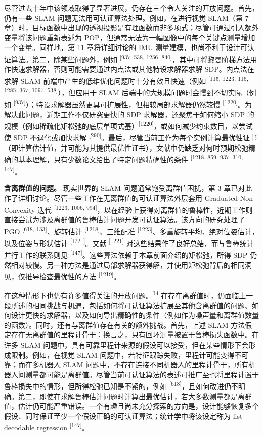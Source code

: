 尽管过去十年中该领域取得了显著进展，仍存在三个令人关注的开放问题。首先，仍有一些 SLAM 问题无法用可认证算法处理。例如，在进行视觉 SLAM（第 7 章）时，目标函数中出现的透视投影是有理函数而非多项式；尽管可通过引入额外变量将该问题重新表述为 POP，但通常无法为一幅图像中的每个关键点测量增加一个变量。同样地，第 11 章将详细讨论的 IMU 测量建模，也尚不利于设计可认证算法。第二，除某些问题外，例如 \textsuperscript{[937, 538, 1256, 840]}，其中可将黎曼阶梯方法用作快速求解器，否则可能需要通过内点法或其他特设求解器求解 SDP。内点法在求解 SLAM 前端中产生的低维优化问题时十分有效且快速（例如 \textsuperscript{[115, 1223, 116, 1285, 367, 1097, 538]}），但应用于 SLAM 后端中的大规模问题时会慢到不切实际（例如 \textsuperscript{[937]}）；特设求解器虽然更具可扩展性，但相较局部求解器仍然较慢 \textsuperscript{[1220]}。为解决此问题，近期工作不仅研究更快的 SDP 求解器，还聚焦于如何缩小 SDP 的规模（例如稀疏化矩松弛的底层单项式基）\textsuperscript{[1220]}，或如何减少约束数目，以尝试使 SDP 不退化或加快求解 \textsuperscript{[290]}。最后，尽管当前工作为每个实例计算最优性证书（即计算估计值，并可能为其提供最优性证书），文献中仍缺乏对何时预期松弛精确的基本理解，只有少数论文给出了特定问题精确性的条件 \textsuperscript{[1218, 859, 937, 310, 147]}。

\textbf{含离群值的问题。} 现实世界的 SLAM 问题通常饱受离群值困扰，第 3 章已对此作了详细讨论。尽管一些工作在无离群值的可认证算法外层套用 Graduated Non-Convexity 迭代 \textsuperscript{[1223, 1006, 994]}，以在经验上获得对离群值的鲁棒性，近期工作则直接尝试为涉及离群值的鲁棒估计问题开发可认证算法。该方向的研究处理了 PGO \textsuperscript{[618, 153]}、旋转估计 \textsuperscript{[1218]}、三维配准 \textsuperscript{[1223]}、多重旋转平均、绝对位姿估计，以及位姿与形状估计 \textsuperscript{[1221]}。文献 \textsuperscript{[1221]} 对这些结果作了良好总结，而与鲁棒统计并行工作的联系则见 \textsuperscript{[147]}。这些算法依赖于本章前面介绍的矩松弛，所得 SDP 仍然相对较慢。另一种方法是通过局部求解器获得解，并使用矩松弛背后的相同洞见，仅推导检查最优性的方法 \textsuperscript{[1219]}。

在这种情形下也仍有许多值得关注的开放问题。\textsuperscript{14} 在存在离群值时，仍面临上一段所述的相同挑战与机遇，包括如何将可认证算法扩展至其他含离群值的问题、如何设计更快的求解器，以及如何导出精确性的条件（例如作为噪声量和离群值数量的函数）。同时，还有与离群值存在有关的额外挑战。首先，上述 SLAM 方法假定存在无离群值的里程计骨干：换言之，只有回环测量被置于鲁棒损失函数中。在许多 SLAM 问题中，具有可靠里程计来源的假设可以接受，但在某些情形下会形成限制。例如，在视觉 SLAM 问题中，若特征跟踪失败，里程计可能变得不可靠；而在多机器人 SLAM 问题中，不存在连接不同机器人的里程计骨干，所有机器人间测量都可能是离群值。尽管当前可认证算法的表述可推广至也将里程计置于鲁棒损失中的情形，但所得松弛已知是不紧的，例如 \textsuperscript{[618]}，且如何改进仍不明确。第二，即使在求解鲁棒估计问题时计算出最优估计，若大多数测量都是离群值，估计仍可能严重错误。一个有趣且尚未充分探索的方向是，设计能够恢复多个假设、同时保证至少一个假设正确的可认证算法；统计学中将该设定称为 list decodable regression \textsuperscript{[147]}。

